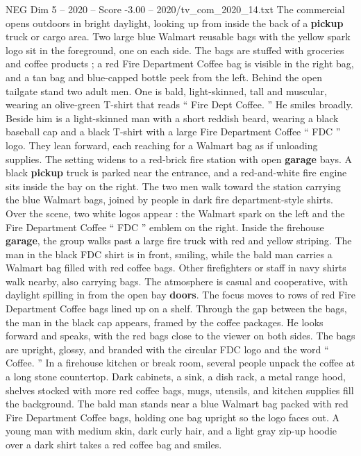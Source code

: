 \begin{textsample}{NEG Dim 5 – 2020 – Score -3.00 – 2020/tv\_com\_2020\_14.txt}  \label{ex:f5_neg_039}
The commercial opens outdoors in bright daylight, looking up from inside the back of a \textbf{pickup} truck or cargo area.
Two large blue Walmart reusable bags with the yellow spark logo sit in the foreground, one on each side.
The bags are stuffed with groceries and coffee products ; a red Fire Department Coffee bag is visible in the right bag, and a tan bag and blue-capped bottle peek from the left.
Behind the open tailgate stand two adult men.
One is bald, light-skinned, tall and muscular, wearing an olive-green T-shirt that reads “ Fire Dept Coffee. ” He smiles broadly.
Beside him is a light-skinned man with a short reddish beard, wearing a black baseball cap and a black T-shirt with a large Fire Department Coffee “ FDC ” logo.
They lean forward, each reaching for a Walmart bag as if unloading supplies.
The setting widens to a red-brick fire station with open \textbf{garage} bays.
A black \textbf{pickup} truck is parked near the entrance, and a red-and-white fire engine sits inside the bay on the right.
The two men walk toward the station carrying the blue Walmart bags, joined by people in dark fire department-style shirts.
Over the scene, two white logos appear : the Walmart spark on the left and the Fire Department Coffee “ FDC ” emblem on the right.
Inside the firehouse \textbf{garage}, the group walks past a large fire truck with red and yellow striping.
The man in the black FDC shirt is in front, smiling, while the bald man carries a Walmart bag filled with red coffee bags.
Other firefighters or staff in navy shirts walk nearby, also carrying bags.
The atmosphere is casual and cooperative, with daylight spilling in from the open bay \textbf{doors}.
The focus moves to rows of red Fire Department Coffee bags lined up on a shelf.
Through the gap between the bags, the man in the black cap appears, framed by the coffee packages.
He looks forward and speaks, with the red bags close to the viewer on both sides.
The bags are upright, glossy, and branded with the circular FDC logo and the word “ Coffee. ” In a firehouse kitchen or break room, several people unpack the coffee at a long stone countertop.
Dark cabinets, a sink, a dish rack, a metal range hood, shelves stocked with more red coffee bags, mugs, utensils, and kitchen supplies fill the background.
The bald man stands near a blue Walmart bag packed with red Fire Department Coffee bags, holding one bag upright so the logo faces out.
A young man with medium skin, dark curly hair, and a light gray zip-up hoodie over a dark shirt takes a red coffee bag and smiles.

\end{textsample}
